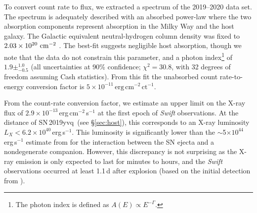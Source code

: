 \documentclass[twocolumn]{aastex63}
\newcommand{\sn}{SN\,2019yvq}
\begin{document}
To convert count rate to flux, we extracted a spectrum of the 2019--2020 data
set. The spectrum is adequately described with an absorbed power-law where the
two absorption components represent absorption in the Milky Way and the host
galaxy. The Galactic equivalent neutral-hydrogen column density was fixed to
$2.03\times10^{20}~{\rm cm}^{-2}$ \citep{HI4PI2016a}. The best-fit suggests
negligible host absorption, though we note that the data do not constrain this
parameter, and a photon index\footnote{The photon index is defined as $A(E)
\propto E^{-\Gamma}$.} of $1.9\pm^{1.0}_{-0.5}$ (all uncertainties at 90\%
confidence; $\chi^2=30.8$, with 32 degrees of freedom assuming Cash
statistics). From this fit the unabsorbed count rate-to-energy conversion
factor is $5\times10^{-11}\,\mathrm{erg\,cm}^{-2}\,\mathrm{ct}^{-1}$.

From the count-rate conversion factor, we estimate an upper limit on the X-ray
flux of $2.9 \times 10^{-13}$\,erg\,cm$^{-2}$\,s$^{-1}$ at the first epoch of
\textit{Swift} observations. At the distance of \sn\ (see \S\ref{sec:host}),
this corresponds to an X-ray luminosity $L_X < 6.2 \times
10^{40}$\,erg\,s$^{-1}$. This luminosity is significantly lower than the
$\sim$5$\times 10^{44}$\,erg\,s$^{-1}$ estimate from \citet{Kasen10a} for the
interaction between the SN ejecta and a nondegenerate companion. However, this
discrepancy is not surprising as the X-ray emission is only expected to last
for minutes to hours, and the \textit{Swift} observations occurred at least
1.1\,d after explosion (based on the initial detection from
\citealt{Itagaki19}).
\end{document}
